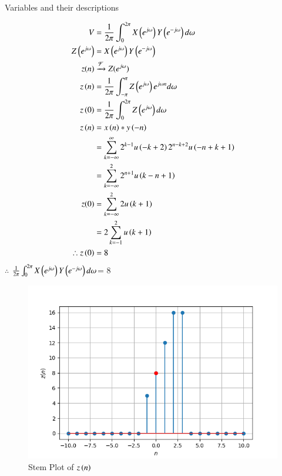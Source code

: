 \documentclass[journal,12pt,twocolumn]{IEEEtran}
\theoremstyle{remark}
\begin{document}
\begin{table}[h]
         
         \caption{Variables and their descriptions}
     \end{table}
\begin{align}
    V&=\frac{1}{2\pi}\int_{0}^{2\pi} X\left(e^{j\omega}\right) Y\left(e^{-j\omega}\right) d \omega\\
     Z\left(e^{j\omega}\right)&= X\left(e^{j\omega}\right) Y\left(e^{-j \omega}\right)\\
           z(n)&\xrightarrow{\mathcal{F}} Z(e^{j\omega})\\
           z\left(n\right)&=\frac{1}{2\pi}\int_{-\pi}^{\pi} Z\left(e^{j\omega}\right) e^{j\omega n} d\omega\\
      z\left(0\right)&=\frac{1}{2\pi}\int_{0}^{2\pi} Z\left(e^{j\omega}\right) d \omega\\
   z\left( n\right)&= x\left(n\right) * y\left(-n\right)\\
   &=\sum_{k=-\infty}^{\infty} 2^{k-1} u\left(-k+2\right) 2^{n-k+2} u\left(-n+k+1\right)\\
   &=\sum_{k=-\infty}^{2} 2^{n+1} u\left(k-n+1\right)\\
   z(0)&=\sum_{k=-\infty}^{2} 2 u\left(k+1\right)\\
   &=2\sum_{k=-1}^{2}u\left(k+1\right)\\
  \therefore z\left(0\right) &=8
\end{align}
$\therefore$ $\frac{1}{2\pi}\int_{0}^{2\pi} X\left(e^{j\omega}\right) Y\left(e^{-j\omega}\right) d \omega$= $8$
\renewcommand{\thefigure}{\theenumi}
 \renewcommand{\thetable}{\theenumi}
\begin{figure}[h]
  
  \includegraphics[width=\columnwidth]{2021/EC/41/figs/Figure_1.png}
  \caption{Stem Plot of $z\left(n\right)$}
\end{figure}
\end{document}
